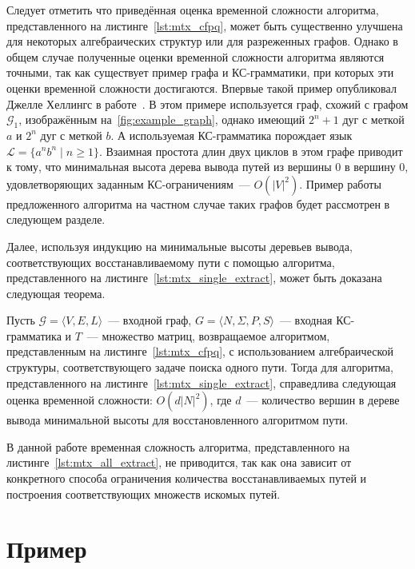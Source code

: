 Следует отметить что приведённая оценка временной сложности алгоритма, представленного на листинге~\ref{lst:mtx_cfpq}, может быть существенно улучшена для некоторых алгебраических структур или для разреженных графов. Однако в общем случае полученные оценки временной сложности алгоритма являются точными, так как существует пример графа и КС-грамматики, при которых эти оценки временной сложности достигаются. Впервые такой пример опубликовал Джелле Хеллингс в работе~\cite{hellings2015querying}. В этом примере используется граф, схожий с графом $\mathcal{G}_1$, изображённым на~\cref{fig:example_graph}, однако имеющий $2^n + 1$ дуг с меткой $a$ и $2^n$ дуг с меткой $b$. А используемая КС-грамматика порождает язык $\mathcal{L} = \{a^nb^n \mid n \geq 1\}$. Взаимная простота длин двух циклов в этом графе приводит к тому, что минимальная высота дерева вывода путей из вершины 0 в вершину 0, удовлетворяющих заданным КС-ограничениям~--- $O(|V|^2)$. Пример работы предложенного алгоритма на частном случае таких графов будет рассмотрен в следующем разделе.

Далее, используя индукцию на минимальные высоты деревьев вывода, соответствующих восстанавливаемому пути с помощью алгоритма, представленного на листинге~\ref{lst:mtx_single_extract}, может быть доказана следующая теорема.

\begin{theorem}\label{thm:time_single_mtx}
	Пусть $\mathcal{G} = \langle V, E, L \rangle$~--- входной граф, $G = \langle N, \Sigma, P, S \rangle$~--- входная КС-грамматика и $T$~--- множество матриц, возвращаемое алгоритмом, представленным на листинге~\ref{lst:mtx_cfpq}, с использованием алгебраической структуры, соответствующего задаче поиска одного пути. Тогда для алгоритма, представленного на листинге~\ref{lst:mtx_single_extract}, справедлива следующая оценка временной сложности: $O(d|N|^2)$, где $d$~--- количество вершин в дереве вывода минимальной высоты для восстановленного алгоритмом пути.
\end{theorem}

В данной работе временная сложность алгоритма, представленного на листинге~\ref{lst:mtx_all_extract}, не приводится, так как она зависит от конкретного способа ограничения количества восстанавливаемых путей и построения соответствующих множеств искомых путей.

\section{Пример}\label{sec:ch3/sect4}

